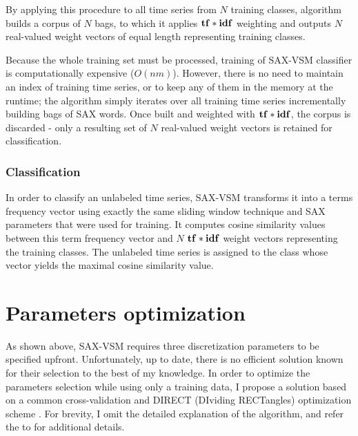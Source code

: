 By applying this procedure to all time series from $N$ training classes, 
algorithm builds a corpus of $N$ bags, to which it applies $\text{\textbf{tf}}\ast\text{\textbf{idf}}$ 
weighting and outputs $N$ real-valued weight vectors of equal length 
representing training classes. 

Because the whole training set must be processed, 
training of SAX-VSM classifier is computationally expensive ($O(nm)$). 
However, there is no need to maintain an index of training time series, 
or to keep any of them in the memory at the runtime;
the algorithm simply iterates over all training time series incrementally building 
bags of SAX words. Once built and weighted with $\text{\textbf{tf}}\ast\text{\textbf{idf}}$, 
the corpus is discarded - only a resulting set of $N$ real-valued weight vectors 
is retained for classification.

\subsubsection{Classification}
In order to classify an unlabeled time series, SAX-VSM transforms it into a
terms frequency vector using exactly the same sliding window technique 
and SAX parameters that were used for training. 
It computes cosine similarity values between this term frequency vector 
and $N$ $\text{\textbf{tf}}\ast\text{\textbf{idf}}$ weight vectors representing the training classes. 
The unlabeled time series is assigned to the class whose vector yields the
maximal cosine similarity value.

\section{Parameters optimization} \label{section-direct}
As shown above, SAX-VSM requires three discretization parameters to be specified upfront. 
Unfortunately, up to date, there is no efficient solution known for their selection to the best 
of my knowledge. In order to optimize the parameters selection while using only a training data, 
I propose a solution based on a common cross-validation and DIRECT (DIviding RECTangles) 
optimization scheme \cite{citeulike:4210208}. For brevity, I omit the detailed explanation 
of the algorithm, and refer the to \cite{citeulike:12563460} for additional details.


